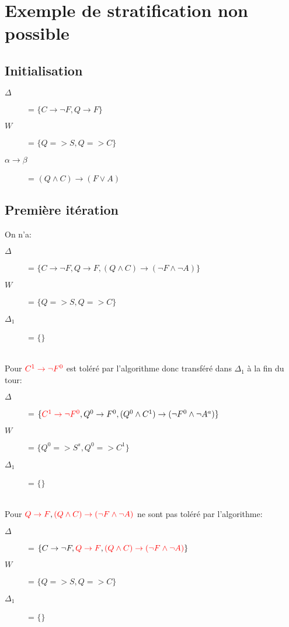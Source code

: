 \section{Exemple de stratification non possible}

\subsection{Initialisation}
\begin{description}
\item[$\Delta$] = $\{ C \rightarrow \neg F, Q \rightarrow F \}$
\item[$W$] = $\{ Q => S, Q => C\}$
\item[$\alpha \rightarrow \beta$] = $ ( Q \wedge C) \rightarrow (F \vee A)$
\end{description}

\subsection{Première itération}
On n'a:
\begin{description}
\item[$\Delta$] = $\{ C \rightarrow \neg F, Q \rightarrow F, ( Q \wedge C) \rightarrow (\neg F \wedge \neg A) \}$
\item[$W$] = $\{ Q => S, Q => C\}$
\item[$\Delta_1$] = $\{ \}$
\end{description}
\ \\
Pour $\textcolor{red}{C^1 \rightarrow \neg F^0}$ est toléré par l'algorithme donc transféré dans $\Delta_1$ à la fin du tour:
\begin{description}
\item[$\Delta$] = $\{ \textcolor{red}{C^1 \rightarrow \neg F^0}, Q^0 \rightarrow F^0, ( Q^0 \wedge C^1) \rightarrow (\neg F^0 \wedge \neg A^a) \}$
\item[$W$] = $\{ Q^0 => S^s, Q^0 => C^1 \}$
\item[$\Delta_1$] = $\{  \}$
\end{description}
\ \\
Pour $\textcolor{red}{Q \rightarrow F}, \textcolor{red}{( Q \wedge C) \rightarrow (\neg F \wedge \neg A)}$ ne sont pas toléré par l'algorithme:
\begin{description}
\item[$\Delta$] = $\{ C \rightarrow \neg F, \textcolor{red}{Q \rightarrow F}, \textcolor{red}{( Q \wedge C) \rightarrow (\neg F \wedge \neg A)} \}$
\item[$W$] = $\{ Q => S, Q => C \}$
\item[$\Delta_1$] = $\{  \}$
\end{description}

